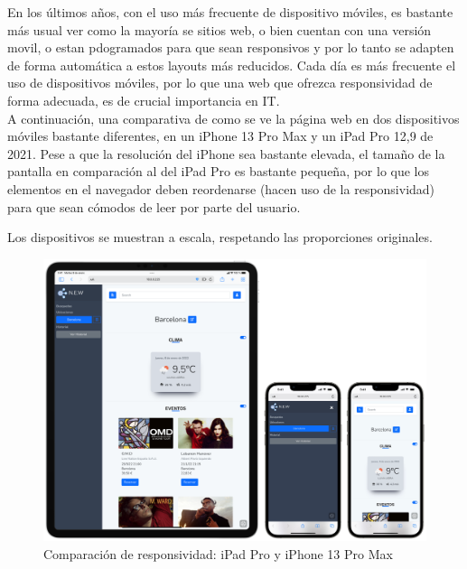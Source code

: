 \documentclass[../ei103948-project-documentation.tex]{subfiles}
\begin{document}
                                En los últimos años, con el uso más frecuente de dispositivo móviles, es bastante más usual ver como la mayoría se sitios web, o bien cuentan con una versión movil, o estan pdogramados para que sean responsivos y por lo tanto se adapten de forma automática a estos layouts más reducidos. Cada día es más frecuente el uso de dispositivos móviles, por lo que una web que ofrezca responsividad de forma adecuada, es de crucial importancia en IT.\\

                                A continuación, una comparativa de como se ve la página web en dos dispositivos móviles bastante diferentes, en un iPhone 13 Pro Max y un iPad Pro 12,9 de 2021. Pese a que la resolución del iPhone sea bastante elevada, el tamaño de la pantalla en comparación al del iPad Pro es bastante pequeña, por lo que los elementos en el navegador deben reordenarse (hacen uso de la responsividad) para que sean cómodos de leer por parte del usuario.

                                \newpage

                                Los dispositivos se muestran a escala, respetando las proporciones originales.


                                \begin{figure}[H]
                                    \begin{center}
                                        \hspace*{-3mm} 
                                    \includegraphics[scale=0.24]{images/ipadiphonecomparacion.png}
                                    \end{center}
                                    \caption{Comparación de responsividad: iPad Pro y iPhone 13 Pro Max}
                                \end{figure}
\end{document}

